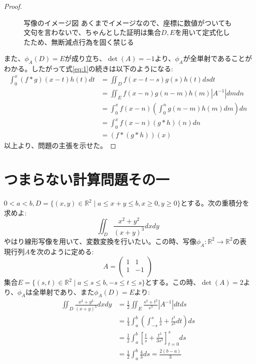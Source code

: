 \documentclass[dvipdfmx]{jreport}
\begin{document}
\begin{proof}
\begin{figure}[H]
		\caption{写像のイメージ図 \newline
		{\footnotesize  あくまでイメージなので、座標に数値がついても文句を言わないで、ちゃんとした証明は集合$D,E$を用いて定式化したため、無断減点行為を固く禁じる} }
	\end{figure}
	また、$\phi_A(D)=E$が成り立ち、$\det(A)=-1$より、$\phi_A$が全単射であることがわかる。したがって式\ref{eq:1}の続きは以下のようになる:
	\begin{equation}
		\begin{aligned}
			\int_0^x \left( f*g \right) (x-t) h(t)dt &=  \iint_{D} f(x-t-s)g(s)h(t)dsdt\\
								 &=  \iint_{E} f(x-n)g(n-m)h(m)|A^{-1}|dmdn \\
								 &=  \int_0^x f(x-n) \left( \int_0^n g(n-m)h(m) dm \right) dn\\
								 &=  \int_0^xf(x-n) (g*h)(n)dn\\
								 &=  \left(f*(g*h) \right)(x)
		\end{aligned}
	\end{equation}
以上より、問題の主張を示せた。
\end{proof}
\newpage
\section{つまらない計算問題その一}
$0<a<b,D= \{ (x,y) \in \mathbb{R}^2 \mid a\le x+y \le b, x\ge 0, y\ge 0 \}$とする。次の重積分を求めよ:
$$
\iint_D \frac{x^2 +y^2}{(x+y)^3}dxdy
$$
やはり線形写像を用いて、変数変換を行いたい。この時、写像$\phi_A : \mathbb{R}^2 \to \mathbb{R}^2$の表現行列$A$を次のように定める:
$$
A=
\left(
\begin{array}{cc}
	1 & 1\\
	1 & -1\\
\end{array}
\right)
$$
集合$E=\{ (s,t) \in \mathbb{R}^2 \mid a \le s \le b, -s \le t \le s\}$とする。この時、$\det(A) = 2$より、$\phi_A $は全単射であり、また$\phi_A(D) =E$より:
$$
\begin{aligned}
	\iint_D \frac{x^2 +y^2}{(x+y)^3}dxdy &= \frac{1}{2} \iint_E \frac{s^2 +t^2}{s^3}|A^{-1}|dtds\\
					     &=\frac{1}{4} \int_a^b \left( \int_{-s}^{s} \frac{1}{s} +\frac{t^2}{s^3} dt \right) ds\\
					     &=\frac{1}{2} \int_a^b \left[ \frac{t}{s} + \frac{t^3}{3s^3} \right]_{t=0}^sds \\
					     &=\frac{1}{2} \int_a^b \frac{4}{3} ds =\frac{2(b-a)}{3}
\end{aligned}
$$
\newpage
\end{document}
